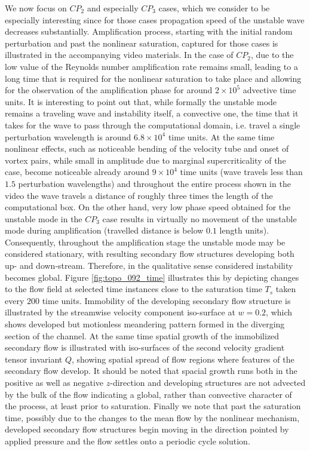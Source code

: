 \documentclass[lineno]{jfm}
\begin{document}
We now focus on $CP_2$ and especially $CP_3$ cases, which we consider to be especially interesting since for those cases propagation speed of the unstable wave decreases substantially.
Amplification process, starting with the initial random perturbation and past the nonlinear saturation, captured for those cases is illustrated in the accompanying video materials.
In the case of $CP_2$, due to the low value of the Reynolds number amplification rate remains small, leading to a long time that is required for the nonlinear saturation to take place and allowing for the observation of the amplification phase for around $2\times10^5$ advective time units.
It is interesting to point out that, while formally the unstable mode remains a traveling wave and instability itself, a convective one, the time that it takes for the wave to pass through the computational domain, i.e. travel a single perturbation wavelength is around $6.8\times10^4$ time units.
At the same time nonlinear effects, such as noticeable bending of the velocity tube and onset of vortex pairs, while small in amplitude due to marginal supercriticality of the case, become noticeable already around $9\times10^4$ time units (wave travels less than $1.5$ perturbation wavelengths) and
throughout the entire process shown in the video the wave travels a distance of roughly three times the length of the computational box.
On the other hand, very low phase speed obtained for the unstable mode in the $CP_3$ case results in virtually no movement of the unstable mode during amplification (travelled distance is below $0.1$ length units).
Consequently, throughout the amplification stage the unstable mode may be considered stationary, with resulting secondary flow structures developing both up- and down-stream.
Therefore, in the qualitative sense considered instability becomes global.
Figure \ref{fig:topo_092_time} illustrates this by depicting changes to the flow field at selected time instances close to the saturation time $T_s$ taken every $200$ time units.
Immobility of the developing secondary flow structure is illustrated by the streamwise velocity component iso-surface at $w=0.2$, which shows developed but motionless meandering pattern formed in the diverging section of the channel. 
At the same time spatial growth of the immobilized secondary flow is illustrated with iso-surfaces of the second velocity gradient tensor invariant $Q$,
showing spatial spread of flow regions where features of the secondary flow develop.
It should be noted that spacial growth runs both in the positive as well as negative $z$-direction  and developing structures are not advected by the bulk of the flow indicating a global, rather than convective character of the process, at least prior to saturation.
Finally we note that past the saturation time, possibly due to the changes to the mean flow by the nonlinear mechanism, developed secondary flow structures begin moving in the direction pointed by applied pressure and the flow settles onto a periodic cycle solution. 
\end{document}

